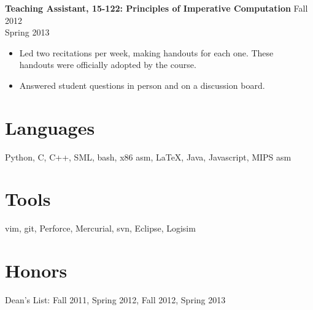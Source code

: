 \documentclass[margin]{res}
\begin{document}
\begin{resume}
  \textbf{Teaching Assistant, 15-122: Principles of Imperative Computation}
    \hfill Fall 2012\\ \hphantom{1em} \hfill Spring 2013

  \vspace{-1em}\vspace{-1ex}
  \begin{itemize} \itemsep -2pt
    \item Led two recitations per week, making handouts for each one.  These \\
      handouts were officially adopted by the course.
    \item Answered student questions in person and on a discussion board.
  \end{itemize}

\section{Languages}
  Python, C, C++, SML, bash, x86 asm, \LaTeX, Java, Javascript, MIPS asm

\section{Tools}
  vim, git, Perforce, Mercurial, svn, Eclipse, Logisim

\section{Honors}
  Dean's List: Fall 2011, Spring 2012, Fall 2012, Spring 2013 \\

\end{resume}
\end{document}
